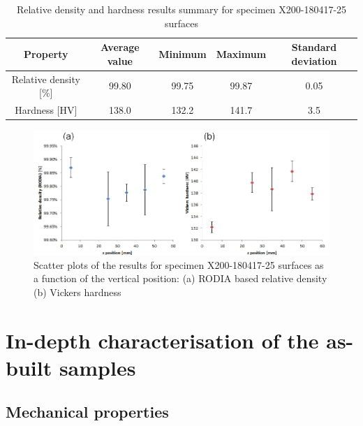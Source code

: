  \begin{center}
	\begin{table}[ht]
		\begin{tabular}{|c|c |c |c| c|}
			\hline
			Property& Average value & Minimum & Maximum & Standard deviation \\
			\hline 
			\hline   
			Relative density [\%] & 99.80 & 99.75 & 99.87 & 0.05\\
			Hardness [HV] &138.0 &132.2 &141.7&3.5\\
			\hline
		\end{tabular}

		\caption[Relative density and hardness results summary for specimen X200-180417-25 surfaces]{Relative density and hardness results summary for specimen X200-180417-25 surfaces}
		\label{tab:25}
	\end{table}
\end{center}


\begin{figure}[ht]
\centering
\centerline{\includegraphics[scale=0.72]{Images/SausHD}}
\decoRule
\caption[Scatter plots of the results for specimen X200-180417-25 surfaces as a function of the vertical position: (a) RODIA based relative density (b) Vickers hardness]{Scatter plots of the results for specimen X200-180417-25 surfaces as a function of the vertical position: (a) RODIA based relative density (b) Vickers hardness}
\label{fig:HD-180417}
\end{figure} 


\section{In-depth characterisation of the as-built samples} 
\label{RCABS}

\subsection{Mechanical properties}

